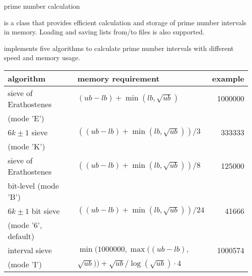 
\newcommand{\upperbound}{\mathit{upper\uscore bound}}
\newcommand{\lowerbound}{\mathit{lower\uscore bound}}
\newcommand{\maxnumberofprimes}{\mathit{max\uscore number\uscore of\uscore primes}}
\newcommand{\mode}{\mathit{mode}}
\renewcommand{\prime}{\mathit{prime}}
\newcommand{\pl}{\mathit{pl}}



\NAME

 \dotfill prime number calculation



\ABSTRACT

 is a class that provides efficient calculation and storage of prime number
intervals in memory.  Loading and saving lists from/to files is also supported.



\DESCRIPTION

 implements five algorithms to calculate prime number intervals with different
speed and memory usage.

\begin{center}
  \begin{tabular}{|l|l|r|} \hline
    algorithm & memory requirement & example \\\hline
    sieve of Erathostenes & $(ub - lb) + \min(lb, \sqrt{ub})$ & 1000000 \\
    (mode 'E') & & \\\hline
    $6k\pm 1$ sieve & $((ub - lb) + \min(lb, \sqrt{ub})) / 3$ & 333333 \\
    (mode 'K') & & \\\hline
    sieve of Erathostenes & $((ub - lb) + \min(lb, \sqrt{ub})) / 8$ & 125000 \\
    bit-level (mode 'B') & & \\\hline
    $6k\pm 1$ bit sieve & $((ub - lb) + \min(lb, \sqrt{ub})) / 24$ & 41666 \\
    (mode '6', default) & & \\\hline
    interval sieve & $\min(1000000, \max((ub - lb),$ & 1000574 \\
    (mode 'I') & $\sqrt{ub})) + \sqrt{ub} / \log(\sqrt{ub}) \cdot 4$ & \\\hline
  \end{tabular}
\end{center}

